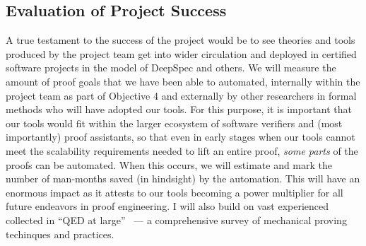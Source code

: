 \subsection{Evaluation of Project Success}

A true testament to the success of the project would be to see theories and tools produced by the project team get into wider circulation and deployed in certified software projects in the model of DeepSpec and others.
We will measure the amount of proof goals that we have been able to automated, internally within the project team as part of Objective 4 and externally by other researchers in formal methods who will have adopted our tools.
For this purpose, it is important that our tools would fit within the larger ecosystem of software verifiers and (most importantly) proof assistants,
so that even in early stages when our tools cannot meet the scalability requirements needed to lift an entire proof,
\emph{some parts} of the proofs can be automated.
When this occurs, we will estimate and mark the number of man-months saved (in hindsight) by the automation.
This will have an enormous impact as it attests to our tools becoming a power multiplier for all future endeavors in proof engineering.
I will also build on vast experienced collected in ``QED at large''~\cite{Book2019:Ringer} --- a comprehensive survey of mechanical proving techinques and practices.